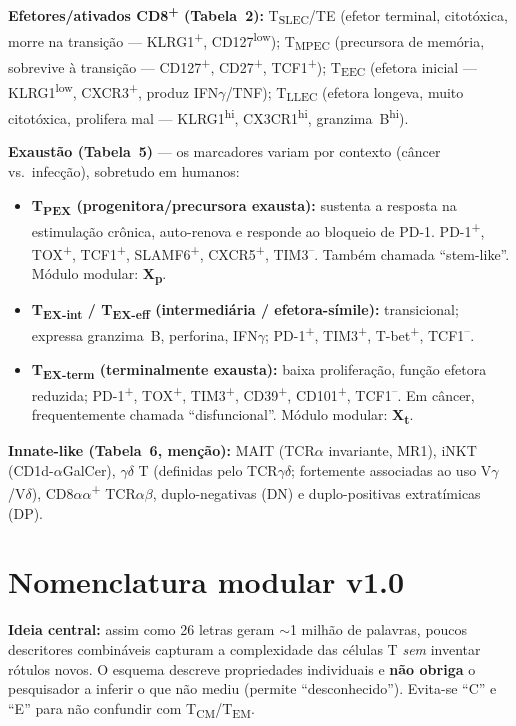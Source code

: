 \documentclass[11pt,a4paper]{article}
\newcommand{\up}[1]{\textsuperscript{#1}}          %
\newcommand{\tc}[1]{T\textsubscript{#1}}           %
\newcommand{\gd}{\ensuremath{\gamma\delta}}        %
\newcommand{\ifng}{IFN\ensuremath{\gamma}}
\begin{document}
\noindent\textbf{Efetores/ativados CD8\up{+} (Tabela~2):} \tc{SLEC}/TE (efetor terminal,
citotóxica, morre na transição --- KLRG1\up{+}, CD127\up{low}); \tc{MPEC} (precursora de memória,
sobrevive à transição --- CD127\up{+}, CD27\up{+}, TCF1\up{+}); \tc{EEC} (efetora inicial ---
KLRG1\up{low}, CXCR3\up{+}, produz \ifng{}/TNF); \tc{LLEC} (efetora longeva, muito citotóxica,
prolifera mal --- KLRG1\up{hi}, CX3CR1\up{hi}, granzima~B\up{hi}).

\vspace{4pt}
\noindent\textbf{Exaustão (Tabela~5)} --- os marcadores variam por contexto (câncer vs.\
infecção), sobretudo em humanos:
\begin{itemize}[leftmargin=1.4em,itemsep=2pt]
  \item \textbf{\tc{PEX} (progenitora/precursora exausta):} sustenta a resposta na estimulação
        crônica, auto-renova e responde ao bloqueio de PD-1. PD-1\up{+}, TOX\up{+}, TCF1\up{+},
        SLAMF6\up{+}, CXCR5\up{+}, TIM3\up{--}. Também chamada ``stem-like''. Módulo modular: \textbf{X\textsubscript{p}}.
  \item \textbf{\tc{EX-int} / \tc{EX-eff} (intermediária / efetora-símile):} transicional;
        expressa granzima~B, perforina, \ifng{}; PD-1\up{+}, TIM3\up{+}, T-bet\up{+}, TCF1\up{--}.
  \item \textbf{\tc{EX-term} (terminalmente exausta):} baixa proliferação, função efetora
        reduzida; PD-1\up{+}, TOX\up{+}, TIM3\up{+}, CD39\up{+}, CD101\up{+}, TCF1\up{--}. Em câncer,
        frequentemente chamada ``disfuncional''. Módulo modular: \textbf{X\textsubscript{t}}.
\end{itemize}

\noindent\textbf{Innate-like (Tabela~6, menção):} MAIT (TCR$\alpha$ invariante, MR1),
iNKT (CD1d-$\alpha$GalCer), \gd{} T (definidas pelo TCR\gd{}; fortemente associadas ao uso
V$\gamma$/V$\delta$), CD8$\alpha\alpha$\up{+} TCR$\alpha\beta$, duplo-negativas (DN) e
duplo-positivas extratímicas (DP).

\section{Nomenclatura modular v1.0}
\label{sec:modular}
\textbf{Ideia central:} assim como 26 letras geram $\sim$1 milhão de palavras, poucos
descritores combináveis capturam a complexidade das células T \emph{sem} inventar rótulos
novos. O esquema descreve propriedades individuais e \textbf{não obriga} o pesquisador a
inferir o que não mediu (permite ``desconhecido''). Evita-se ``C'' e ``E'' para não confundir
com \tc{CM}/\tc{EM}.
\end{document}
